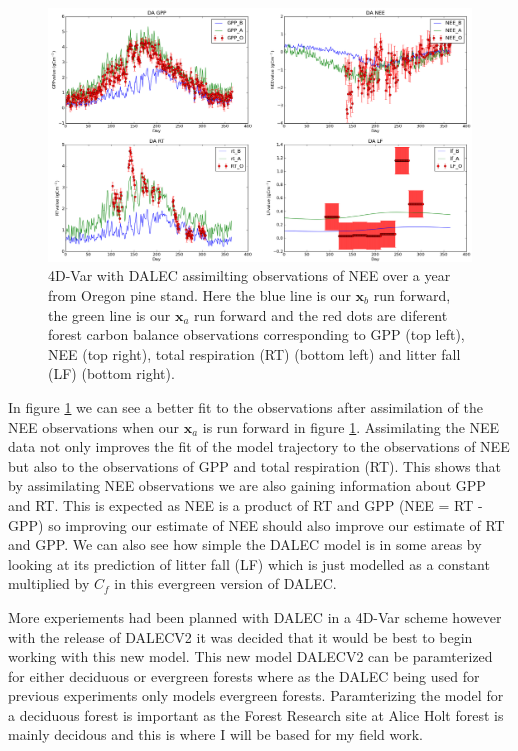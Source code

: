 \documentclass[11pt]{article}
\begin{document}
\begin{figure}[ht]
\centering
\includegraphics[height=.55\textwidth, ]{dacodeneeonly.png}
\caption{4D-Var with DALEC assimilting observations of NEE over a year from Oregon pine stand. Here the blue line is our $\textbf{x}_b$ run forward, the green line is our $\textbf{x}_a$ run forward and the red dots are diferent forest carbon balance observations corresponding to GPP (top left), NEE (top right), total respiration (RT) (bottom left) and litter fall (LF) (bottom right).}
\label{4dvardalec}
\end{figure}
In figure \ref{4dvardalec} we can see a better fit to the observations after assimilation of the NEE observations when our $\textbf{x}_a$ is run forward in figure \ref{4dvardalec}. Assimilating the NEE data not only improves the fit of the model trajectory to the observations of NEE but also to the observations of GPP and total respiration (RT). This shows that by assimilating NEE observations we are also gaining information about GPP and RT. This is expected as NEE is a product of RT and GPP (NEE = RT - GPP) so improving our estimate of NEE should also improve our estimate of RT and GPP. We can also see how simple the DALEC model is in some areas by looking at its prediction of litter fall (LF) which is just modelled as a constant multiplied by $C_f$ in this evergreen version of DALEC.

More experiements had been planned with DALEC in a 4D-Var scheme however with the release of DALECV2 \cite{Bloom2014} it was decided that it would be best to begin working with this new model. This new model DALECV2 can be paramterized for either deciduous or evergreen forests where as the DALEC being used for previous experiments only models evergreen forests. Paramterizing the model for a deciduous forest is important as the Forest Research site at Alice Holt forest is mainly decidous and this is where I will be based for my field work.
\end{document}
